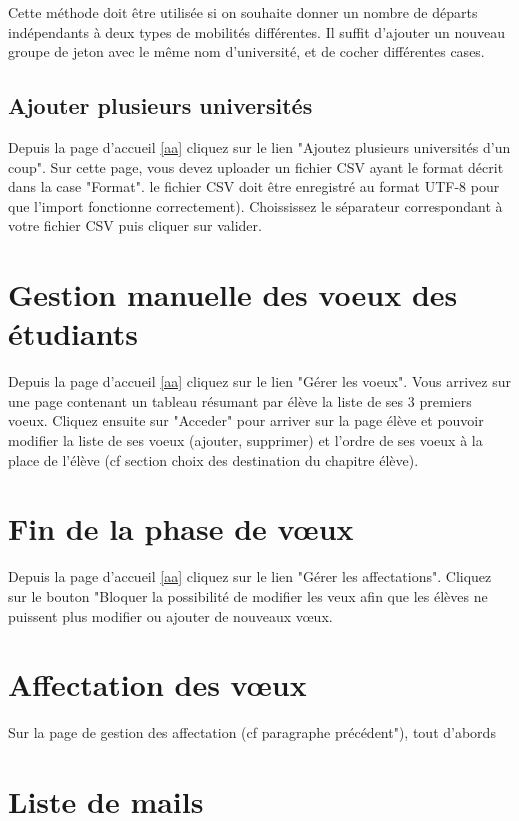 \smallbreak

Cette méthode doit être utilisée si on souhaite donner un nombre de départs indépendants à deux types de mobilités différentes. Il suffit d'ajouter un nouveau groupe de jeton avec le même nom d'université, et de cocher différentes cases.


\subsection{Ajouter plusieurs universités} 
\label{au}

Depuis la page d'accueil \ref{aa} cliquez sur le lien "Ajoutez plusieurs universités d'un coup". Sur cette page, vous devez uploader un fichier CSV ayant le format décrit dans la case "Format". \att le fichier CSV doit être enregistré au format UTF-8 pour que l'import fonctionne correctement). Choississez le séparateur correspondant à votre fichier CSV puis cliquer sur valider.

\section{Gestion manuelle des voeux des étudiants}

Depuis la page d'accueil \ref{aa} cliquez sur le lien "Gérer les voeux". Vous arrivez sur une page contenant un tableau résumant par élève la liste de ses 3 premiers voeux. Cliquez ensuite sur "Acceder" pour arriver sur la page élève et pouvoir modifier la liste de ses voeux (ajouter, supprimer) et l'ordre de ses voeux à la place de l'élève (cf section choix des destination du chapitre élève).

\section{Fin de la phase de vœux} 

Depuis la page d'accueil \ref{aa} cliquez sur le lien "Gérer les affectations". Cliquez sur le bouton "Bloquer la possibilité de modifier les veux afin que les élèves ne puissent plus modifier ou ajouter de nouveaux vœux.

\section{Affectation des vœux}
\label{afv}

Sur la page de gestion des affectation (cf paragraphe précédent"), tout d'abords

\section{Liste de mails}

